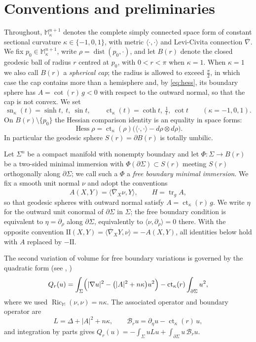 \documentclass[10pt,a4paper]{amsart}
\newcommand{\M}{\mathbb{M}}
\newcommand{\ct}{\operatorname{ct}_\kappa}
\newcommand{\sn}{\operatorname{sn}_\kappa}
\newcommand{\Hess}{\operatorname{Hess}}
\newcommand{\Ric}{\operatorname{Ric}}
\newcommand{\tr}{\operatorname{tr}}
\newcommand{\dist}{\operatorname{dist}}
\newcommand{\bconn}{\overline{\nabla}}
\begin{document}
\section{Conventions and preliminaries}\label{sec:prelim}

Throughout, $\M^{n+1}_\kappa$ denotes the complete simply connected space form of constant sectional curvature $\kappa\in\{-1,0,1\}$, with metric $\langle\cdot,\cdot\rangle$ and Levi-Civita connection $\bconn$. We fix $p_0\in\M^{n+1}_\kappa$, write $\rho=\dist(p_0,\cdot)$, and let $B(r)$ denote the closed geodesic ball of radius $r$ centred at $p_0$, with $0<r<\pi$ when $\kappa=1$. When $\kappa=1$ we also call $B(r)$ a \emph{spherical cap}; the radius is allowed to exceed $\tfrac\pi2$, in which case the cap contains more than a hemisphere and, by \eqref{eq:hess}, its boundary sphere has $A=\cot(r)\,g<0$ with respect to the outward normal, so that the cap is not convex. We set
\[
\sn(t)=\sinh t,\ t,\ \sin t,\qquad \ct(t)=\coth t,\ \tfrac1t,\ \cot t\qquad(\kappa=-1,0,1).
\]
On $B(r)\setminus\{p_0\}$ the Hessian comparison identity is an equality in space forms:
\begin{equation}\label{eq:hess}
\Hess\rho=\ct(\rho)\bigl(\langle\cdot,\cdot\rangle-d\rho\otimes d\rho\bigr).
\end{equation}
In particular the geodesic sphere $S(r)=\partial B(r)$ is totally umbilic.

Let $\Sigma^n$ be a compact manifold with nonempty boundary and let $\Phi:\Sigma\to B(r)$ be a two-sided minimal immersion with $\Phi(\partial\Sigma)\subset S(r)$ meeting $S(r)$ orthogonally along $\partial\Sigma$; we call such a $\Phi$ a \emph{free boundary minimal immersion}. We fix a smooth unit normal $\nu$ and adopt the conventions
\[
A(X,Y)=\langle\bconn_X\nu,Y\rangle,\qquad H=\tr_g A,
\]
so that geodesic spheres with outward normal satisfy $A=\ct(r)\,g$. We write $\eta$ for the outward unit conormal of $\partial\Sigma$ in $\Sigma$; the free boundary condition is equivalent to $\eta=\partial_\rho$ along $\partial\Sigma$, equivalently to $\langle\nu,\partial_\rho\rangle=0$ there. With the opposite convention $\mathrm{II}(X,Y)=\langle\bconn_XY,\nu\rangle=-A(X,Y)$, all identities below hold with $A$ replaced by $-\mathrm{II}$.

The second variation of volume for free boundary variations is governed by the quadratic form (see \cite[\S 5]{Med23}, \cite[\S 2.3]{NZ1})
\begin{equation}\label{eq:secondvar}
Q_r(u)=\int_\Sigma\Bigl(|\nabla u|^2-\bigl(|A|^2+n\kappa\bigr)u^2\Bigr)-\ct(r)\int_{\partial\Sigma}u^2,
\end{equation}
where we used $\Ric_{\M}(\nu,\nu)=n\kappa$. The associated operator and boundary operator are
\[
L=\Delta+|A|^2+n\kappa,\qquad \mathcal{B}_r u=\partial_\eta u-\ct(r)\,u,
\]
and integration by parts gives $Q_r(u)=-\int_\Sigma uLu+\int_{\partial\Sigma}u\,\mathcal{B}_ru$.
\end{document}
